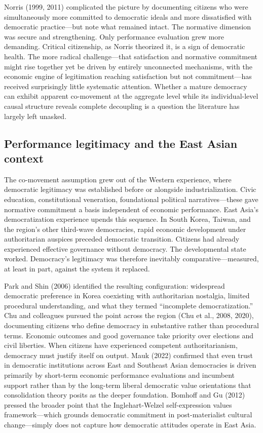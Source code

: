 \documentclass[
  12pt,
  12pt,
  letterpaper]{article}
\begin{document}
Norris (1999, 2011) complicated the picture by documenting citizens who
were simultaneously more committed to democratic ideals and more
dissatisfied with democratic practice---but note what remained intact.
The normative dimension was secure and strengthening. Only performance
evaluation grew more demanding. Critical citizenship, as Norris
theorized it, is a sign of democratic health. The more radical
challenge---that satisfaction and normative commitment might rise
together yet be driven by entirely unconnected mechanisms, with the
economic engine of legitimation reaching satisfaction but not
commitment---has received surprisingly little systematic attention.
Whether a mature democracy can exhibit apparent co-movement at the
aggregate level while its individual-level causal structure reveals
complete decoupling is a question the literature has largely left
unasked.

\subsection{Performance legitimacy and the East Asian
context}\label{performance-legitimacy-and-the-east-asian-context}

The co-movement assumption grew out of the Western experience, where
democratic legitimacy was established before or alongside
industrialization. Civic education, constitutional veneration,
foundational political narratives---these gave normative commitment a
basis independent of economic performance. East Asia's democratization
experience upends this sequence. In South Korea, Taiwan, and the
region's other third-wave democracies, rapid economic development under
authoritarian auspices preceded democratic transition. Citizens had
already experienced effective governance without democracy. The
developmental state worked. Democracy's legitimacy was therefore
inevitably comparative---measured, at least in part, against the system
it replaced.

Park and Shin (2006) identified the resulting configuration: widespread
democratic preference in Korea coexisting with authoritarian nostalgia,
limited procedural understanding, and what they termed ``incomplete
democratization.'' Chu and colleagues pursued the point across the
region (Chu et al., 2008, 2020), documenting citizens who define
democracy in substantive rather than procedural terms. Economic outcomes
and good governance take priority over elections and civil liberties.
When citizens have experienced competent authoritarianism, democracy
must justify itself on output. Mauk (2022) confirmed that even trust in
democratic institutions across East and Southeast Asian democracies is
driven primarily by short-term economic performance evaluations and
incumbent support rather than by the long-term liberal democratic value
orientations that consolidation theory posits as the deeper foundation.
Bomhoff and Gu (2012) pressed the broader point that the
Inglehart-Welzel self-expression values framework---which grounds
democratic commitment in post-materialist cultural change---simply does
not capture how democratic attitudes operate in East Asia.
\end{document}
